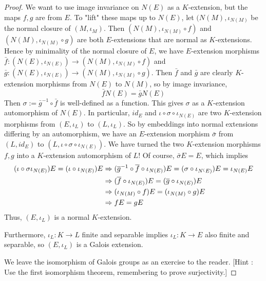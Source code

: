 \documentclass[../book.tex]{subfiles}
\begin{document}
\begin{proof}
        We want to use image invariance on $N(E)$ as a $K$-extension,
        but the maps $f, g$ are from $E$. 
        To "lift" these maps up to $N(E)$, 
        let $(N(M),\iota_{N(M)}$ be the normal closure of $(M,\iota_M)$. 
        Then $(N(M),\iota_{N(M)}\circ f)$ and $(N(M),\iota_{N(M)}\circ g)$
        are both $E$-extensions that are normal as $K$-extensions.
        Hence by minimality of the normal closure of $E$, 
        we have $E$-extension morphisms 
        $\bar{f} : (N(E),\iota_{N(E)}) \to (N(M),\iota_{N(M)}\circ f)$
        and $\bar{g} : (N(E),\iota_{N(E)}) \to (N(M),\iota_{N(M)}\circ g)$.
        Then $\bar{f}$ and $\bar{g}$ are clearly $K$-extension morphisms
        from $N(E)$ to $N(M)$,
        so by image invariance, \[ \bar{f} N(E) = \bar{g} N(E) \]
        Then $\sigma := \bar{g}^{-1} \circ \bar{f}$ is well-defined as a function.
        This gives $\sigma$ as a $K$-extension automorphism of $N(E)$. 
        In particular, $id_E$ and $\iota\circ\sigma\circ\iota_{N(E)}$ 
        are two $K$-extension morphisms from $(E,\iota_L)$ to $(L,\iota_L)$.
        So by embeddings into normal extensions differing by an automorphism, 
        we have an $E$-extension morphism $\bar{\sigma}$
        from $(L,id_E)$ to $(L,\iota\circ\sigma\circ\iota_{N(E)})$.
        We have turned the two $K$-extension morphisms $f, g$ into 
        a $K$-extension automorphism of $L$!
        Of course, $\bar{\sigma} E = E$, which implies \begin{align*}
            (\iota\circ\sigma\iota_{N(E)}) E = (\iota\circ\iota_{N(E)}) E &\Rightarrow
            (\overline{g}^{-1}\circ\overline{f}\circ\iota_{N(E)}) E = (\sigma\circ\iota_{N^(E)})E
                = \iota_{N(E)} E \\
            &\Rightarrow (\overline{f}\circ\iota_{N(E)}) E = (\overline{g}\circ\iota_{N(E)}) E \\
            &\Rightarrow (\iota_{N(M)}\circ f) E = (\iota_{N(M)}\circ g) E \\
            &\Rightarrow f E = g E
        \end{align*}
        Thus, $(E,\iota_L)$ is a normal $K$-extension. 
        
        Furthermore, $\iota_L : K \to L$ finite and separable implies 
        $\iota_L : K \to E$ also finite and separable,
        so $(E,\iota_L)$ is a Galois extension. 
        
        We leave the isomorphism of Galois groups as an exercise to the reader. 
        [Hint : Use the first isomorphism theorem, remembering to prove surjectivity.]
\end{proof}
\end{document}
